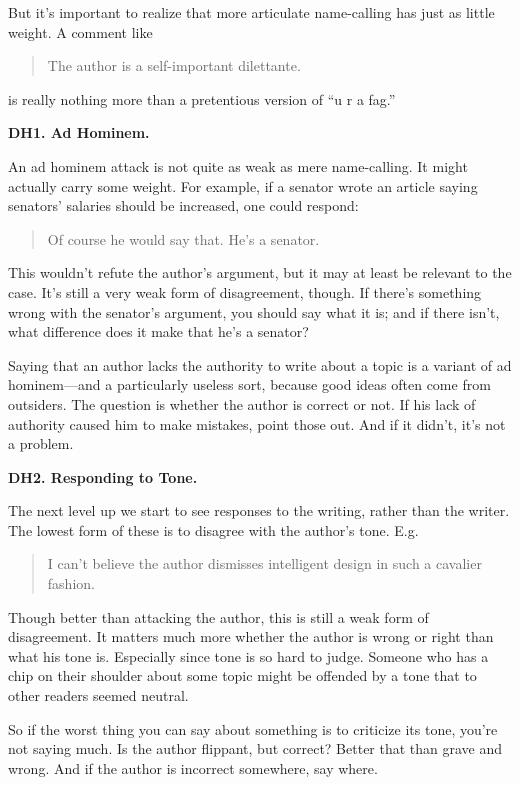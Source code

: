 \documentclass[12pt]{book}
\begin{document}
But it's important to realize that more articulate name-calling has just
as little weight. A comment like

\begin{quote}
The author is a self-important dilettante.
\end{quote}

is really nothing more than a pretentious version of ``u r a fag.''

\textbf{DH1. Ad Hominem.}

An ad hominem attack is not quite as weak as mere name-calling. It might
actually carry some weight. For example, if a senator wrote an article
saying senators' salaries should be increased, one could respond:

\begin{quote}
Of course he would say that. He's a senator.
\end{quote}

This wouldn't refute the author's argument, but it may at least be
relevant to the case. It's still a very weak form of disagreement,
though. If there's something wrong with the senator's argument, you
should say what it is; and if there isn't, what difference does it make
that he's a senator?

Saying that an author lacks the authority to write about a topic is a
variant of ad hominem---and a particularly useless sort, because good
ideas often come from outsiders. The question is whether the author is
correct or not. If his lack of authority caused him to make mistakes,
point those out. And if it didn't, it's not a problem.

\textbf{DH2. Responding to Tone.}

The next level up we start to see responses to the writing, rather than
the writer. The lowest form of these is to disagree with the author's
tone. E.g.

\begin{quote}
I can't believe the author dismisses intelligent design in such a
cavalier fashion.
\end{quote}

Though better than attacking the author, this is still a weak form of
disagreement. It matters much more whether the author is wrong or right
than what his tone is. Especially since tone is so hard to judge.
Someone who has a chip on their shoulder about some topic might be
offended by a tone that to other readers seemed neutral.

So if the worst thing you can say about something is to criticize its
tone, you're not saying much. Is the author flippant, but correct?
Better that than grave and wrong. And if the author is incorrect
somewhere, say where.
\end{document}
